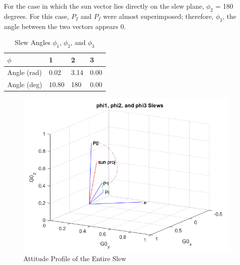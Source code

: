 \documentclass[letterpaper, preprint, paper,11pt]{AAS}	%
\begin{document}
			For the case in which the sun vector lies directly on the slew plane, $\phi_2$ = 180 degrees. For this case, $P_2$ and $P_f$ were almost superimposed; therefore, $\phi_3$, the angle between the two vectors appears 0. 
			
			
			
			\begin{table}[H]
				\centering
				\caption{Slew Angles $\phi_1$, $\phi_2$, and $\phi_3$}
				\begin{tabular}{llll}
					\toprule
					\midrule
					$\phi$ & 1 & 2 & 3 \\
					\midrule
					Angle (rad) & 0.02 & 3.14 & 0.00 \\
					Angle (deg) & 10.80 & 180 & 0.00 \\ 
					\midrule
					\bottomrule
				\end{tabular}%
				\label{tab:FOG_SF}%
			\end{table}%
			
					\begin{figure}[H]
				\label{fig:phi1_phi2_phi3_alpha0}
				\includegraphics[width=6.25in]{figures/alpha0/phi1_phi2_phi3.png}
				\caption{Attitude Profile of the Entire Slew}
			\end{figure}
			
\end{document}
